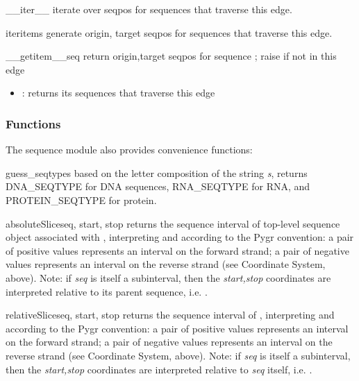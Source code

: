 \documentclass{howto}
\begin{document}
\begin{funcdesc}{__iter__}{}
  iterate over seqpos for sequences that traverse this edge.
\end{funcdesc}

\begin{funcdesc}{iteritems}{}
  generate origin, target seqpos for sequences that traverse this edge.
\end{funcdesc}

\begin{funcdesc}{__getitem__}{seq}
  return origin,target seqpos for sequence ;
  raise  if not in this edge
\end{funcdesc}

\begin{itemize}
\item
{}: returns its sequences that traverse this edge
\end{itemize}


\subsubsection{Functions}
The sequence module also provides convenience functions:

\begin{funcdesc}{guess_seqtype}{s}
  based on the letter composition of
  the string {\em s}, returns DNA_SEQTYPE for DNA sequences, 
  RNA_SEQTYPE for RNA, and PROTEIN_SEQTYPE for protein.
\end{funcdesc}

\begin{funcdesc}{absoluteSlice}{seq, start, stop}
  returns the sequence interval of top-level sequence object associated
  with , interpreting  and  according to
  the Pygr convention: a pair of positive values represents an interval
  on the forward strand; a pair of negative values represents an
  interval on the reverse strand (see Coordinate System, above).
  Note: if {\em seq} is itself a subinterval, then the {\em start,stop}
  coordinates are interpreted relative to its parent sequence, i.e.
  .
\end{funcdesc}


\begin{funcdesc}{relativeSlice}{seq, start, stop}
  returns the sequence interval of , interpreting
   and  according to
  the Pygr convention: a pair of positive values represents an interval
  on the forward strand; a pair of negative values represents an
  interval on the reverse strand (see Coordinate System, above).
  Note: if {\em seq} is itself a subinterval, then the {\em start,stop}
  coordinates are interpreted relative to {\em seq} itself, i.e.
  .
\end{funcdesc}
\end{document}
